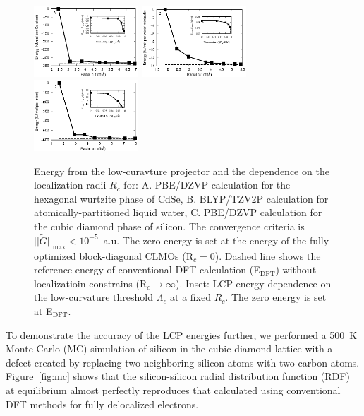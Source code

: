 \documentclass[aps,prl,twocolumn,reprint,amsmath,amssymb]{revtex4-1}
\begin{document}
\begin{figure}
\centering
\includegraphics[width=0.35\textwidth]{CdSe_conv}
\includegraphics[width=0.35\textwidth]{H2O_conv}
\includegraphics[width=0.35\textwidth]{Si_conv}
\caption{Energy from the low-curavture projector and the dependence on the localization radii $R_c$ for: A. PBE/DZVP calculation for the hexagonal wurtzite phase of CdSe, B. BLYP/TZV2P calculation for atomically-partitioned liquid water, C. PBE/DZVP calculation for the cubic diamond phase of silicon. The convergence criteria is $\vert\vert \tilde{G} \vert\vert_{\text{max}} < 10^{-5}$~a.u. The zero energy is set at the energy of the fully optimized block-diagonal CLMOs (R$_c = 0$). Dashed line shows the reference energy of conventional DFT calculation (E$_{\text{DFT}}$) without localizatioin constrains (R$_c\rightarrow \infty$). 
Inset: LCP energy dependence on the low-curvature threshold $\Lambda_c$ at a fixed $R_c$. The zero energy is set at E$_{\text{DFT}}$.}
\label{fig:accuracy}
\end{figure}

To demonstrate the accuracy of the LCP energies further, we performed a 500~K Monte Carlo (MC) simulation of silicon in the cubic diamond lattice with a defect created by replacing two neighboring silicon atoms with two carbon atoms. Figure~\ref{fig:mc} shows that the silicon-silicon radial distribution function (RDF) at equilibrium almost perfectly reproduces that calculated using conventional DFT methods for fully delocalized electrons. 
\end{document}
